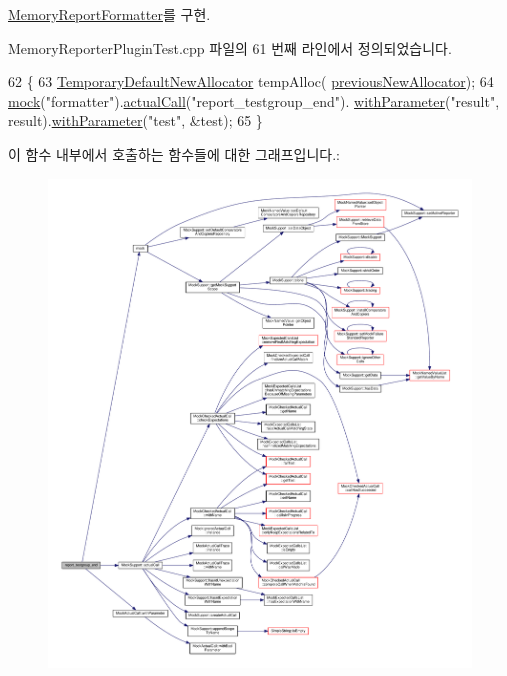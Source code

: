 \hyperlink{class_memory_report_formatter_aa6b20dc53db478226037eaac7ae7b49e}{Memory\+Report\+Formatter}를 구현.



Memory\+Reporter\+Plugin\+Test.\+cpp 파일의 61 번째 라인에서 정의되었습니다.


\begin{DoxyCode}
62     \{
63         \hyperlink{class_temporary_default_new_allocator}{TemporaryDefaultNewAllocator} tempAlloc(
      \hyperlink{_memory_reporter_plugin_test_8cpp_a8462e36388a54721a0ecdc37a48784ee}{previousNewAllocator});
64         \hyperlink{_mock_support_8h_ac44b0374b926cc12a3d8b24361f8a6a7}{mock}(\textcolor{stringliteral}{"formatter"}).\hyperlink{class_mock_support_a9b0ef024cdc513368395ef23d9e3af39}{actualCall}(\textcolor{stringliteral}{"report\_testgroup\_end"}).
      \hyperlink{class_mock_actual_call_a158f3ada8f73127b977d5353d4e4dea0}{withParameter}(\textcolor{stringliteral}{"result"}, result).\hyperlink{class_mock_actual_call_a158f3ada8f73127b977d5353d4e4dea0}{withParameter}(\textcolor{stringliteral}{"test"}, &test);
65     \}
\end{DoxyCode}


이 함수 내부에서 호출하는 함수들에 대한 그래프입니다.\+:
\nopagebreak
\begin{figure}[H]
\begin{center}
\leavevmode
\includegraphics[width=350pt]{class_mock_memory_report_formatter_a8e6e205c7d958ab4aa1637b06c4b2e29_cgraph}
\end{center}
\end{figure}



